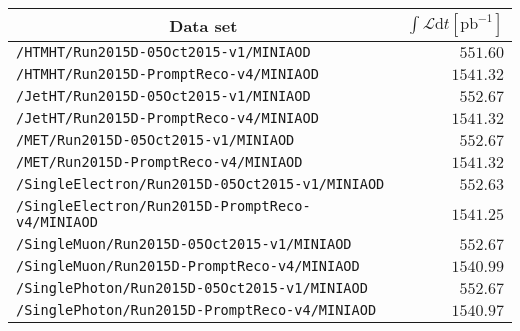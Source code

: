 \begin{center}
\begin{tabular}{lr}
\hline\hline
\multicolumn{1}{c}{Data set}&\multicolumn{1}{c}{$\int\mathcal{L}\textrm{d}t [\textrm{pb}^{-1}]$}\tabularnewline
\hline
\verb!/HTMHT/Run2015D-05Oct2015-v1/MINIAOD! &$ 551.60$\tabularnewline
\verb!/HTMHT/Run2015D-PromptReco-v4/MINIAOD! &$1541.32$\tabularnewline
\verb!/JetHT/Run2015D-05Oct2015-v1/MINIAOD! &$ 552.67$\tabularnewline
\verb!/JetHT/Run2015D-PromptReco-v4/MINIAOD! &$1541.32$\tabularnewline
\verb!/MET/Run2015D-05Oct2015-v1/MINIAOD! &$ 552.67$\tabularnewline
\verb!/MET/Run2015D-PromptReco-v4/MINIAOD! &$1541.32$\tabularnewline
\verb!/SingleElectron/Run2015D-05Oct2015-v1/MINIAOD! &$ 552.63$\tabularnewline
\verb!/SingleElectron/Run2015D-PromptReco-v4/MINIAOD! &$1541.25$\tabularnewline
\verb!/SingleMuon/Run2015D-05Oct2015-v1/MINIAOD! &$ 552.67$\tabularnewline
\verb!/SingleMuon/Run2015D-PromptReco-v4/MINIAOD! &$1540.99$\tabularnewline
\verb!/SinglePhoton/Run2015D-05Oct2015-v1/MINIAOD! &$ 552.67$\tabularnewline
\verb!/SinglePhoton/Run2015D-PromptReco-v4/MINIAOD! &$1540.97$\tabularnewline
\hline
\end{tabular}\end{center}

